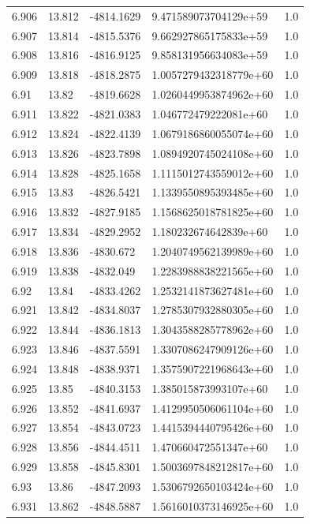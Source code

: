 \begin{tabular}{lllll}
6.906 & 13.812 & -4814.1629 & 9.471589073704129e+59 & 1.0 \\
6.907 & 13.814 & -4815.5376 & 9.662927865175833e+59 & 1.0 \\
6.908 & 13.816 & -4816.9125 & 9.858131956634083e+59 & 1.0 \\
6.909 & 13.818 & -4818.2875 & 1.0057279432318779e+60 & 1.0 \\
6.91 & 13.82 & -4819.6628 & 1.0260449953874962e+60 & 1.0 \\
6.911 & 13.822 & -4821.0383 & 1.046772479222081e+60 & 1.0 \\
6.912 & 13.824 & -4822.4139 & 1.0679186860055074e+60 & 1.0 \\
6.913 & 13.826 & -4823.7898 & 1.0894920745024108e+60 & 1.0 \\
6.914 & 13.828 & -4825.1658 & 1.1115012743559012e+60 & 1.0 \\
6.915 & 13.83 & -4826.5421 & 1.1339550895393485e+60 & 1.0 \\
6.916 & 13.832 & -4827.9185 & 1.1568625018781825e+60 & 1.0 \\
6.917 & 13.834 & -4829.2952 & 1.180232674642839e+60 & 1.0 \\
6.918 & 13.836 & -4830.672 & 1.2040749562139989e+60 & 1.0 \\
6.919 & 13.838 & -4832.049 & 1.2283988838221565e+60 & 1.0 \\
6.92 & 13.84 & -4833.4262 & 1.2532141873627481e+60 & 1.0 \\
6.921 & 13.842 & -4834.8037 & 1.2785307932880305e+60 & 1.0 \\
6.922 & 13.844 & -4836.1813 & 1.3043588285778962e+60 & 1.0 \\
6.923 & 13.846 & -4837.5591 & 1.3307086247909126e+60 & 1.0 \\
6.924 & 13.848 & -4838.9371 & 1.3575907221968643e+60 & 1.0 \\
6.925 & 13.85 & -4840.3153 & 1.385015873993107e+60 & 1.0 \\
6.926 & 13.852 & -4841.6937 & 1.4129950506061104e+60 & 1.0 \\
6.927 & 13.854 & -4843.0723 & 1.4415394440795426e+60 & 1.0 \\
6.928 & 13.856 & -4844.4511 & 1.470660472551347e+60 & 1.0 \\
6.929 & 13.858 & -4845.8301 & 1.5003697848212817e+60 & 1.0 \\
6.93 & 13.86 & -4847.2093 & 1.5306792650103424e+60 & 1.0 \\
6.931 & 13.862 & -4848.5887 & 1.5616010373146925e+60 & 1.0 \\

\end{tabular}
